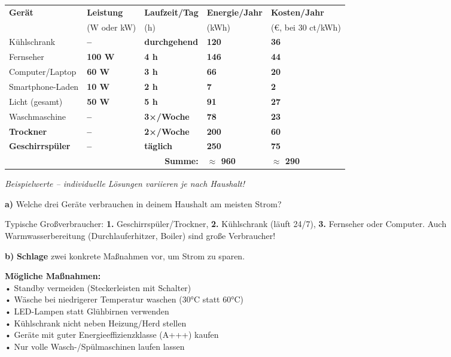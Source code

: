 \documentclass[11pt, a4paper]{article}
\newcommand{\lsg}[1]{\textcolor{loesung}{\textbf{#1}}}
\newcommand{\operator}[1]{\textbf{\textcolor{fachfarbe}{#1}}}
\begin{document}
\vspace{0.5em}
\renewcommand{\arraystretch}{1.8}
\begin{tabularx}{\linewidth}{|p{3.2cm}|X|X|X|X|}
\hline
\textbf{Gerät} & \textbf{Leistung} & \textbf{Laufzeit/Tag} & \textbf{Energie/Jahr} & \textbf{Kosten/Jahr} \\
 & (W oder kW) & (h) & (kWh) & (€, bei 30 ct/kWh) \\
\hline
Kühlschrank & \lsg{--} & \lsg{durchgehend} & \lsg{120} & \lsg{36} \\
\hline
Fernseher & \lsg{100 W} & \lsg{4 h} & \lsg{146} & \lsg{44} \\
\hline
Computer/Laptop & \lsg{60 W} & \lsg{3 h} & \lsg{66} & \lsg{20} \\
\hline
Smartphone-Laden & \lsg{10 W} & \lsg{2 h} & \lsg{7} & \lsg{2} \\
\hline
Licht (gesamt) & \lsg{50 W} & \lsg{5 h} & \lsg{91} & \lsg{27} \\
\hline
Waschmaschine & \lsg{--} & \lsg{3×/Woche} & \lsg{78} & \lsg{23} \\
\hline
\lsg{Trockner} & \lsg{--} & \lsg{2×/Woche} & \lsg{200} & \lsg{60} \\
\hline
\lsg{Geschirrspüler} & \lsg{--} & \lsg{täglich} & \lsg{250} & \lsg{75} \\
\hline
\multicolumn{3}{|r|}{\textbf{Summe:}} & \lsg{$\approx$ 960} & \lsg{$\approx$ 290} \\
\hline
\end{tabularx}
\renewcommand{\arraystretch}{1.0}

\vspace{0.3em}
\textcolor{loesung}{\small\textit{Beispielwerte – individuelle Lösungen variieren je nach Haushalt!}}

\vspace{0.5em}
\textbf{a)} Welche drei Geräte verbrauchen in deinem Haushalt am meisten Strom?

\vspace{0.3em}
\textcolor{loesung}{Typische Großverbraucher: \textbf{1.} Geschirrspüler/Trockner, \textbf{2.} Kühlschrank (läuft 24/7), \textbf{3.} Fernseher oder Computer. Auch Warmwasserbereitung (Durchlauferhitzer, Boiler) sind große Verbraucher!}

\vspace{0.5em}
\textbf{b)} \operator{Schlage} zwei konkrete Maßnahmen vor, um Strom zu sparen.

\vspace{0.3em}
\textcolor{loesung}{\textbf{Mögliche Maßnahmen:}\\
• Standby vermeiden (Steckerleisten mit Schalter)\\
• Wäsche bei niedrigerer Temperatur waschen (30°C statt 60°C)\\
• LED-Lampen statt Glühbirnen verwenden\\
• Kühlschrank nicht neben Heizung/Herd stellen\\
• Geräte mit guter Energieeffizienzklasse (A+++) kaufen\\
• Nur volle Wasch-/Spülmaschinen laufen lassen}
\end{document}

